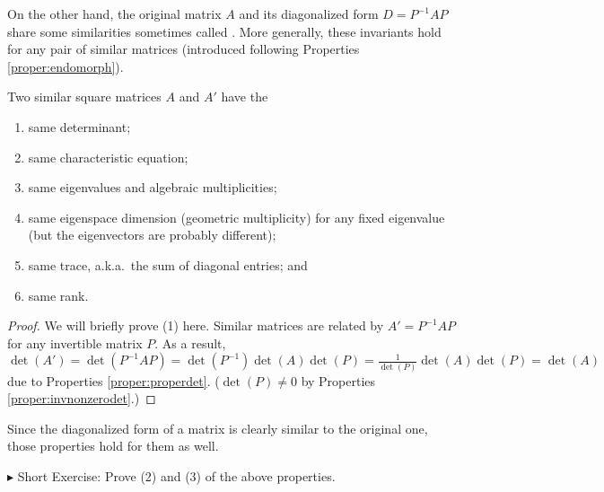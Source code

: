 On the other hand, the original matrix $A$ and its diagonalized form $D = P^{-1}AP$ share some similarities sometimes called . More generally, these invariants hold for any pair of similar matrices (introduced following Properties \ref{proper:endomorph}). 
\begin{proper}
\label{proper:similarinvariant}
Two similar square matrices $A$ and $A'$ have the
\begin{enumerate}
\item same determinant;
\item same characteristic equation;
\item same eigenvalues and algebraic multiplicities;
\item same eigenspace dimension (geometric multiplicity) for any fixed eigenvalue (but the eigenvectors are probably different);
\item same trace, a.k.a.\ the sum of diagonal entries; and
\item same rank.
\end{enumerate}
\end{proper}
\begin{proof}
We will briefly prove (1) here. Similar matrices are related by $A' = P^{-1}AP$ for any invertible matrix $P$. As a result, $\det(A') = \det(P^{-1}AP) = \det(P^{-1})\det(A)\det(P) = \frac{1}{\det(P)}\det(A)\det(P) = \det(A)$ due to Properties \ref{proper:properdet}. ($\det(P) \neq 0$ by Properties \ref{proper:invnonzerodet}.)
\end{proof}
Since the diagonalized form of a matrix is clearly similar to the original one, those properties hold for them as well.\par
$\blacktriangleright$ Short Exercise: Prove (2) and (3) of the above properties.\footnotemark\par

